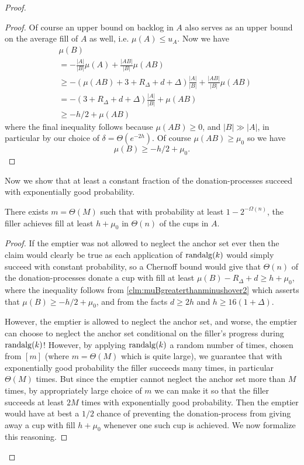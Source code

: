 \begin{proof}
\begin{proof}
  Of course an upper bound on backlog in $A$ also serves as
  an upper bound on the average fill of $A$ as well, i.e.
  $\mu(A) \le u_A$.  Now we have
  \begin{align*}
    &\mu(B) \\
           &= -\frac{|A|}{|B|} \mu(A) + \frac{|A B|}{|B|}\mu(A B) \\
           &\ge -(\mu(AB) + 3+R_\Delta+d+\Delta) \frac{|A|}{|B|} + \frac{|AB|}{|B|}\mu(AB)\\
           &= -(3+R_\Delta+d + \Delta) \frac{|A|}{|B|} + \mu(AB)\\
           &\ge -h/2 + \mu(AB)
  \end{align*}
  where the final inequality follows because $\mu(AB) \ge 0$, and
  $|B|\gg |A|$, in particular by our choice of $\delta = \Theta(e^{-2h})$.
  Of course $\mu(AB) \ge \mu_0$ so we have
  $$\mu(B) \ge -h/2 + \mu_0.$$

\end{proof}

Now we show that at least a constant fraction of the
donation-processes succeed with exponentially good probability.
\begin{clm}
  \label{clm:baseChernoffBound}
  There exists $m =\Theta(M)$ such that with
  probability at least $1-2^{-\Omega(n)}$, the filler achieves
  fill at least $h+\mu_0$ in $\Theta(n)$ of the cups in $A$. 
\end{clm}
\begin{proof}
  If the emptier was not allowed to neglect the anchor set ever
  then the claim would clearly be true as each application of
  $\operatorname{\text{\textup{randalg}}}(k)$ would simply succeed with constant
  probability, so a Chernoff bound would give that $\Theta(n)$ of
  the donation-processes donate a cup with fill at least $\mu(B)
  - R_\Delta + d \ge h + \mu_0$, where the inequality follows
  from \cref{clm:muBgreaterthanminushover2} which asserts that
  $\mu(B) \ge -h/2 + \mu_0$, and from the facts $d\ge 2h$ and $h
  \ge 16(1+\Delta)$. 

  However, the emptier is allowed to neglect
  the anchor set, and worse, the emptier can choose to neglect
  the anchor set conditional on the filler's progress during
  $\operatorname{\text{\textup{randalg}}}(k)$! However, by applying $\operatorname{\text{\textup{randalg}}}(k)$ a random
  number of times, chosen from $[m]$ (where $m=\Theta(M)$ which
  is quite large), we guarantee that with exponentially good
  probability the filler succeeds many times, in particular
  $\Theta(M)$ times. But since the emptier cannot neglect the
  anchor set more than $M$ times, by appropriately large choice
  of $m$ we can make it so that the filler succeeds at least $2M$
  times with exponentially good probability. Then the emptier
  would have at best a $1/2$ chance of preventing the
  donation-process from giving away a cup with fill $h+\mu_0$
  whenever one such cup is achieved. We now formalize this
  reasoning.


\end{proof}
\end{proof}
